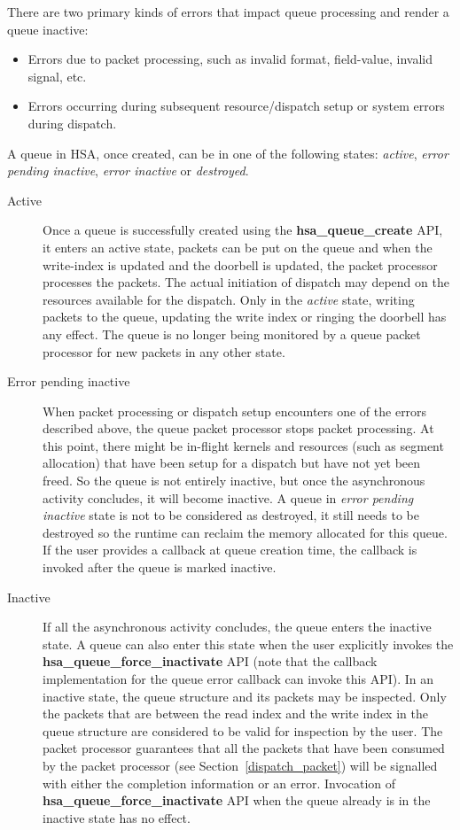\documentclass{book}
\newcommand{\reffun}[1]{\textbf{#1}}
\begin{document}
There are two primary kinds of errors that impact queue
processing and render a queue inactive:
\begin{itemize}
        \item Errors due to packet processing, such as invalid
                format, field-value, invalid signal, etc.
        \item Errors occurring during subsequent resource/dispatch
                setup or system errors during dispatch.
\end{itemize}

A queue in HSA, once created, can be in one of the following states:
\emph{active}, \emph{error pending inactive}, \emph{error inactive}
or \emph{destroyed}.

\begin{description}
\item[Active] Once a queue is successfully created using the
\reffun{hsa\_queue\_create} API, it enters an active state, packets can
be put on the queue and when the write-index is updated and the
doorbell is updated, the packet processor processes the packets. The
actual initiation of dispatch may depend on the resources available
for the dispatch.
Only in the \emph{active} state, writing packets to
the queue, updating the write index or ringing the doorbell has
any effect. The queue is no longer being monitored by a queue packet
processor for new packets in any other state.

\item[Error pending inactive] When packet processing or
dispatch setup encounters one of the errors described above, the
queue packet processor stops packet processing.
At this point, there might be in-flight kernels and resources (such
as segment allocation) that have been setup for a dispatch but have
not yet been freed. So the queue is not entirely inactive, but once
the asynchronous activity concludes, it will become inactive.  A
queue in \emph{error pending inactive} state is not to be considered
as destroyed, it still needs to be destroyed so the runtime can
reclaim the memory allocated for this queue. If the user provides a
callback at queue creation time, the callback is invoked after
the queue is marked inactive.

\item[Inactive] If all the asynchronous activity concludes, the
queue enters the inactive state.
A queue can also enter this state when the user explicitly invokes
the \reffun{hsa\_queue\_force\_inactivate} API (note that the callback
implementation for the queue error callback can invoke this API).
In an inactive state, the queue
structure and its packets may be inspected. Only the packets that
are between the read index and the write index
in the queue structure are considered to be valid for inspection by
the user. The packet processor guarantees that all the packets that
have been consumed by the packet processor (see
Section~\ref{dispatch_packet}) will be signalled with either the
completion information or an error.
Invocation of \reffun{hsa\_queue\_force\_inactivate} API when the
queue already is in the inactive state has no effect.


\end{description}
\end{document}
